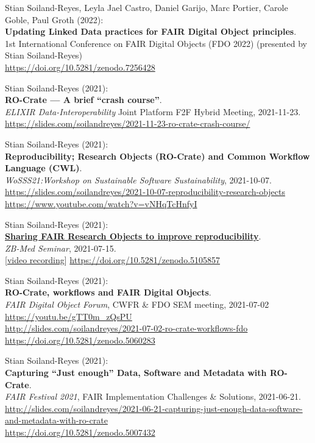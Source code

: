 Stian Soiland-Reyes, Leyla Jael Castro, Daniel Garijo, Marc Portier,
Carole Goble, Paul Groth (2022):\\
\textbf{Updating Linked Data practices for FAIR Digital Object principles}.\\
1st International Conference on FAIR Digital Objects (FDO 2022)
(presented by Stian Soiland-Reyes)\\
\url{https://doi.org/10.5281/zenodo.7256428}

Stian Soiland-Reyes (2021):\\
\textbf{RO-Crate --- A brief ``crash course''}.\\
\emph{ELIXIR Data-Interoperability} Joint Platform F2F Hybrid Meeting, 2021-11-23.\\
\url{https://slides.com/soilandreyes/2021-11-23-ro-crate-crash-course/}

Stian Soiland-Reyes (2021):\\
\textbf{Reproducibility; Research Objects (RO-Crate) and Common Workflow Language (CWL)}.\\
\emph{{WoSSS21}:Workshop
on Sustainable Software Sustainability}, 2021-10-07.\\
\url{https://slides.com/soilandreyes/2021-10-07-reproducibility-research-objects}\\
\url{https://www.youtube.com/watch?v=vNHqTcHnfyI}

Stian Soiland-Reyes (2021):\\
\href{http://slides.com/soilandreyes/2021-07-15-sharing-fair-research-objects}{\textbf{Sharing
FAIR Research Objects to improve reproducibility}}.\\
\emph{ZB-Med Seminar}, 2021-07-15.\\
{[}\href{https://youtu.be/CL_fqtQRPmw}{video recording}{]}
\url{https://doi.org/10.5281/zenodo.5105857}

Stian Soiland-Reyes (2021):\\
\textbf{RO-Crate, workflows and FAIR Digital Objects}.\\
\emph{FAIR Digital Object Forum}, {CWFR \& FDO SEM meeting}, 2021-07-02\\
\url{https://youtu.be/gTT0m_zQsPU}\\
\url{http://slides.com/soilandreyes/2021-07-02-ro-crate-workflows-fdo}\\
\url{https://doi.org/10.5281/zenodo.5060283}


Stian Soiland-Reyes (2021):\\
\textbf{Capturing ``Just enough'' Data, Software and Metadata with RO-Crate}.\\
\emph{FAIR Festival 2021}, FAIR Implementation Challenges \& Solutions, 2021-06-21. \\
\url{http://slides.com/soilandreyes/2021-06-21-capturing-just-enough-data-software-and-metadata-with-ro-crate}\\
\url{https://doi.org/10.5281/zenodo.5007432}

